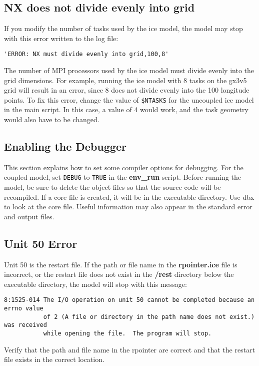 \subsection{NX does not divide evenly into grid}

If you modify the number of tasks used by the ice model, the model may stop
with this error written to the log file:
\begin{verbatim}
'ERROR: NX must divide evenly into grid,100,8'
\end{verbatim}

The number of MPI processors used by the ice model must divide evenly into the grid
dimensions.  For example, running the ice model with 8 tasks on the gx3v5
grid will result in an error, since 8 does not divide evenly into the
100 longitude points.  To fix this error, change the value of {\tt \$NTASKS} for the
uncoupled ice model in the main script.  In this case, a value of 4 would work, and
the task geometry would also have to be changed.

\subsection{Enabling the Debugger}

This section explains how to set some compiler options for debugging. For
the coupled model, set {\tt DEBUG} to {\tt TRUE} in the {\bf env\_run} script.
Before running the model, be sure to delete the
object files so that the source code will be recompiled.  If a core file
is created, it will be in the executable directory.  Use dbx to look at
the core file. Useful information may also appear in the standard error
and output files.

\subsection{Unit 50 Error}

Unit 50 is the restart file.  If the path or file name in the {\bf rpointer.ice}
file is incorrect, or the restart file does not exist in the {\bf /rest} directory
below the executable directory, the model will stop with this message:

\begin{verbatim}
8:1525-014 The I/O operation on unit 50 cannot be completed because an errno value
           of 2 (A file or directory in the path name does not exist.) was received
           while opening the file.  The program will stop.
\end{verbatim}

Verify that the path and file name in the rpointer are correct and that the restart
file exists in the correct location.

